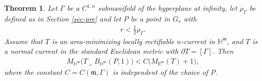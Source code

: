 \documentclass[11pt,reqno]{amsart}
\newcommand{\fm}{\mathfrak{m}}
\newtheorem{theorem}{Theorem}[section]
\theoremstyle{definition}
\numberwithin{equation}{section}
\begin{document}
\begin{theorem}\label{thm-mass}
Let $\Gamma$ be a $C^{1,\alpha}$ submanifold of the hyperplane at infinity, let $\rho_\Gamma$ be defined as in Section \ref{sec-pre} and let $P$ be a point in $G_r$ with
\begin{align}\label{eq-xm-P}
    r < \tfrac{1}{2}\rho_\Gamma.
\end{align}Assume that $T$ is an area-minimizing locally rectifiable $n$-current in $\mathbb{H}^\fm$, and $T$ is a normal current in the standard Euclidean metric with $\partial T = [\Gamma]$. Then 
\begin{align}
    M_{\mathbb{H}^\fm}\bigl(T \mathbin{\llcorner} B_{\mathbb{H}^\fm}(P, 1)\bigr) < C\bigl(M_{\mathbb{R}^\fm}(T) +1\bigr),
\end{align}
where the constant $C = C(\fm,\Gamma)$ is independent of the choice of  $P$.
\end{theorem}
\end{document}
